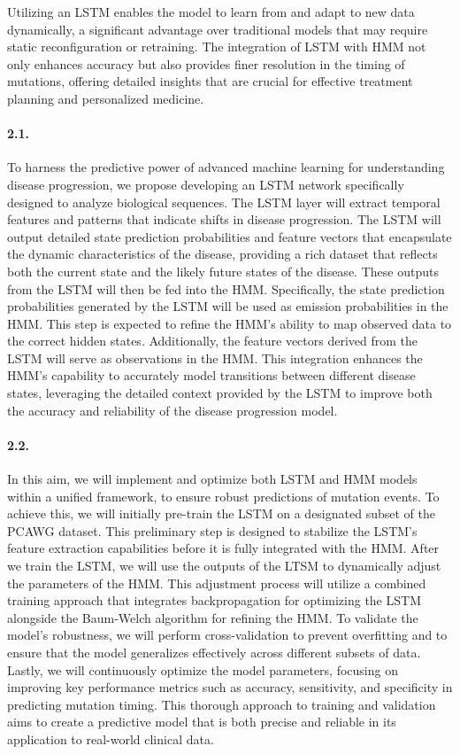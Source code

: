 Utilizing an LSTM enables the model to learn from and adapt to new data dynamically, 
a significant advantage over traditional models that may require static reconfiguration or retraining. 
The integration of LSTM with HMM not only enhances accuracy but also provides finer resolution in the timing of mutations, 
offering detailed insights that are crucial for effective treatment planning and personalized medicine.

\paragraph{2.1. \SpecificAimTwoA}

To harness the predictive power of advanced machine learning for understanding disease progression, 
we propose developing an LSTM network specifically designed to analyze biological sequences. 
The LSTM layer will extract temporal features and patterns that indicate shifts in disease progression. 
The LSTM will output detailed state prediction probabilities and feature vectors that 
encapsulate the dynamic characteristics of the disease, 
providing a rich dataset that reflects both the current state and the likely future states of the disease. 
These outputs from the LSTM will then be fed into the HMM. 
Specifically, the state prediction probabilities generated by the LSTM will be used as emission probabilities in the HMM. 
This step is expected to refine the HMM's ability to map observed data to the correct hidden states. 
Additionally, the feature vectors derived from the LSTM will serve as observations in the HMM. 
This integration enhances the HMM’s capability to accurately model transitions between different disease states, 
leveraging the detailed context provided by the LSTM to improve both the accuracy and reliability of the disease progression model.


\paragraph{2.2. \SpecificAimTwoB}

In this aim, we will implement and optimize both LSTM and HMM models within a unified framework, 
to ensure robust predictions of mutation events. 
To achieve this, we will initially pre-train the LSTM on a designated subset of the PCAWG dataset. 
This preliminary step is designed to stabilize the LSTM's feature extraction capabilities before it is fully integrated with the HMM. 
After we train the LSTM, we will use the outputs of the LTSM to dynamically adjust the parameters of the HMM. 
This adjustment process will utilize a combined training approach that integrates backpropagation for optimizing 
the LSTM alongside the Baum-Welch algorithm for refining the HMM. 
To validate the model's robustness, we will perform cross-validation to prevent overfitting 
and to ensure that the model generalizes effectively across different subsets of data. 
Lastly, we will continuously optimize the model parameters, focusing on improving key performance metrics such as 
accuracy, sensitivity, and specificity in predicting mutation timing. 
This thorough approach to training and validation aims to create a predictive model that is both precise and reliable in its application to real-world clinical data.

